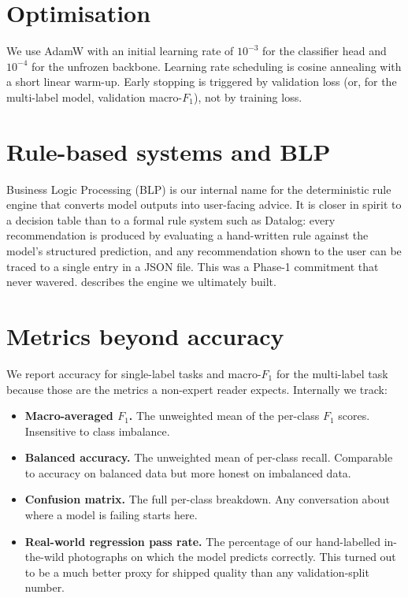 \documentclass[11pt,a4paper,oneside]{report}
\begin{document}
\section{Optimisation}

We use AdamW with an initial learning rate of \(10^{-3}\) for the
classifier head and \(10^{-4}\) for the unfrozen backbone. Learning
rate scheduling is cosine annealing with a short linear warm-up.
Early stopping is triggered by validation loss (or, for the
multi-label model, validation macro-\(F_1\)), not by training loss.

\section{Rule-based systems and BLP}

Business Logic Processing (BLP) is our internal name for the
deterministic rule engine that converts model outputs into
user-facing advice. It is closer in spirit to a decision table than
to a formal rule system such as Datalog: every recommendation is
produced by evaluating a hand-written rule against the model's
structured prediction, and any recommendation shown to the user can
be traced to a single entry in a JSON file. This was a Phase-1
commitment that never wavered.  describes the
engine we ultimately built.

\section{Metrics beyond accuracy}\label{sec:metrics}

We report accuracy for single-label tasks and macro-\(F_1\) for the
multi-label task because those are the metrics a non-expert reader
expects. Internally we track:

\begin{itemize}
    \item \textbf{Macro-averaged \(F_1\).} The unweighted mean of the
        per-class \(F_1\) scores. Insensitive to class imbalance.
    \item \textbf{Balanced accuracy.} The unweighted mean of
        per-class recall. Comparable to accuracy on balanced data
        but more honest on imbalanced data.
    \item \textbf{Confusion matrix.} The full per-class breakdown.
        Any conversation about where a model is failing starts here.
    \item \textbf{Real-world regression pass rate.} The percentage of
        our hand-labelled in-the-wild photographs on which the model
        predicts correctly. This turned out to be a much better
        proxy for shipped quality than any validation-split number.
\end{itemize}
\end{document}
